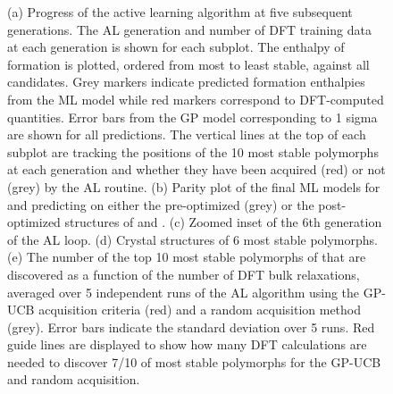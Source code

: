 \begin{figure}[!htb]
\centering
{}
\caption{\label{fig:iro2_al}
(a) Progress of the active learning algorithm at five subsequent generations.
%
The AL generation and number of DFT training data at each generation is shown for each subplot.
%
The enthalpy of formation is plotted, ordered from most to least stable, against all \IrOthree candidates.
%
Grey markers indicate predicted formation enthalpies from the ML model while red markers correspond to DFT-computed quantities.
%
Error bars from the GP model corresponding to 1 sigma are shown for all predictions.
%
The vertical lines at the top of each subplot are tracking the positions of the 10 most stable polymorphs at each generation and whether they have been acquired (red) or not (grey) by the AL routine.
(b) Parity plot of the final ML models for \IrOtwo and \IrOthree predicting on either the pre-optimized (grey) or the post-optimized structures of \IrOtwo and \IrOthree.
(c) Zoomed inset of the 6th generation of the AL loop.
(d) Crystal structures of 6 most stable \IrOthree polymorphs.
(e) The number of the top 10 most stable polymorphs of \IrOthree that are discovered as a function of the number of DFT bulk relaxations, averaged over 5 independent runs of the AL algorithm using the GP-UCB acquisition criteria (red) and a random acquisition method (grey).
%
Error bars indicate the standard deviation over 5 runs.
%
Red guide lines are displayed to show how many DFT calculations are needed to discover 7/10 of most stable polymorphs for the GP-UCB and random acquisition.
}
\end{figure}



